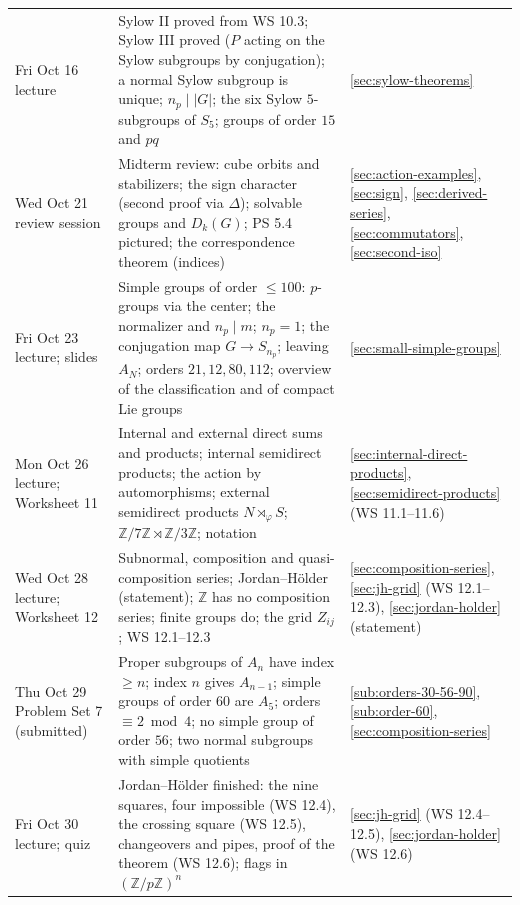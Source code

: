 \documentclass[11pt]{report}
\begin{document}
{\begin{longtable}{p{3.4cm}p{4.2cm}p{6.4cm}}
Fri Oct 16 \newline lecture & Sylow II proved from WS 10.3; Sylow III proved ($P$ acting on the Sylow subgroups by conjugation); a normal Sylow subgroup is unique; $n_p \mid |G|$; the six Sylow $5$-subgroups of $S_5$; groups of order $15$ and $pq$ & \ref{sec:sylow-theorems} \\
Wed Oct 21 \newline review session & Midterm review: cube orbits and stabilizers; the sign character (second proof via $\Delta$); solvable groups and $D_k(G)$; PS 5.4 pictured; the correspondence theorem (indices) & \ref{sec:action-examples}, \ref{sec:sign}, \ref{sec:derived-series}, \ref{sec:commutators}, \ref{sec:second-iso} \\
Fri Oct 23 \newline lecture; slides & Simple groups of order $\leq 100$: $p$-groups via the center; the normalizer and $n_p \mid m$; $n_p = 1$; the conjugation map $G \to S_{n_p}$; leaving $A_N$; orders $21, 12, 80, 112$; overview of the classification and of compact Lie groups & \ref{sec:small-simple-groups} \\
Mon Oct 26 \newline lecture; Worksheet 11 & Internal and external direct sums and products; internal semidirect products; the action by automorphisms; external semidirect products $N \rtimes_\varphi S$; $\mathbb{Z}/7\mathbb{Z} \rtimes \mathbb{Z}/3\mathbb{Z}$; notation & \ref{sec:internal-direct-products}, \ref{sec:semidirect-products} (WS 11.1--11.6) \\
Wed Oct 28 \newline lecture; Worksheet 12 & Subnormal, composition and quasi-composition series; Jordan--H\"older (statement); $\mathbb{Z}$ has no composition series; finite groups do; the grid $Z_{ij}$; WS 12.1--12.3 & \ref{sec:composition-series}, \ref{sec:jh-grid} (WS 12.1--12.3), \ref{sec:jordan-holder} (statement) \\
Thu Oct 29 \newline Problem Set 7 (submitted) & Proper subgroups of $A_n$ have index $\geq n$; index $n$ gives $A_{n-1}$; simple groups of order $60$ are $A_5$; orders $\equiv 2 \bmod 4$; no simple group of order $56$; two normal subgroups with simple quotients & \ref{sub:orders-30-56-90}, \ref{sub:order-60}, \ref{sec:composition-series} \\
Fri Oct 30 \newline lecture; quiz & Jordan--H\"older finished: the nine squares, four impossible (WS 12.4), the crossing square (WS 12.5), changeovers and pipes, proof of the theorem (WS 12.6); flags in $(\mathbb{Z}/p\mathbb{Z})^n$ & \ref{sec:jh-grid} (WS 12.4--12.5), \ref{sec:jordan-holder} (WS 12.6) \\

\end{longtable}}
\end{document}
